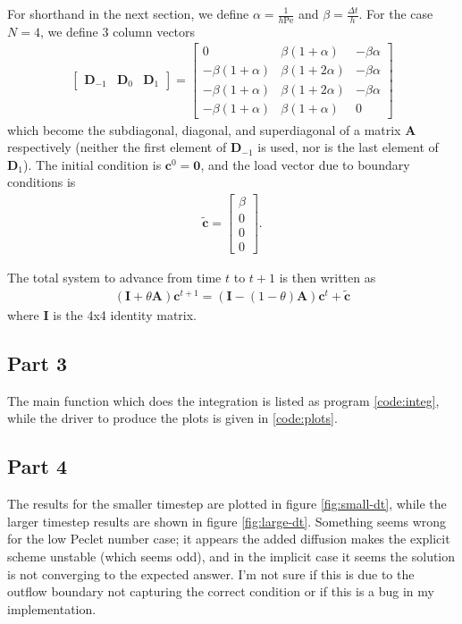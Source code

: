 \documentclass{article}
\begin{document}
For shorthand in the next section, we define $\alpha = \frac{1}{h \mathrm{Pe}}$ and $\beta = \frac{\Delta t}{h}$.
For the case $N=4$, we define 3 column vectors
\begin{align}
    \begin{bmatrix}\mathbf{D}_{-1}  & \mathbf{D}_{0} & \mathbf{D}_{1} \end{bmatrix} =
    \begin{bmatrix}
        0 & \beta (1 + \alpha) & - \beta \alpha \\
        -\beta (1 + \alpha) & \beta (1 + 2 \alpha) & - \beta \alpha \\
        -\beta (1 + \alpha) & \beta (1 + 2 \alpha) & - \beta \alpha \\
        -\beta (1 + \alpha) & \beta (1 + \alpha) & 0
    \end{bmatrix}
\end{align}
which become the subdiagonal, diagonal, and superdiagonal of a matrix $\mathbf{A}$ respectively (neither the first element of $\mathbf{D}_{-1}$ is used, nor is the last element of $\mathbf{D}_{1}$).
The initial condition is $\mathbf{c}^0 = \mathbf{0}$, and the load vector due to boundary conditions is
\begin{align}
    \mathbf{\tilde{c}} =
    \begin{bmatrix}
        \beta \\
        0 \\
        0 \\
        0 
    \end{bmatrix}.
\end{align}

The total system to advance from time $t$ to $t+1$ is then written as
\begin{align}
    (\mathbf{I} + \theta \mathbf{A}) \mathbf{c}^{t+1} = (\mathbf{I} - (1-\theta) \mathbf{A}) \mathbf{c}^{t} + \mathbf{\tilde{c}}
\end{align}
where $\mathbf{I}$ is the 4x4 identity matrix.

\subsection{Part 3}
The main function which does the integration is listed as program \ref{code:integ},
while the driver to produce the plots is given in \ref{code:plots}.



\subsection{Part 4}
The results for the smaller timestep are plotted in figure \ref{fig:small-dt}, while the larger timestep results are shown in figure \ref{fig:large-dt}.
Something seems wrong for the low Peclet number case; it appears the added diffusion makes the explicit scheme unstable (which seems odd), and in the implicit case it seems the solution is not converging to the expected answer. I'm not sure if this is due to the outflow boundary not capturing the correct condition or if this is a bug in my implementation.
\end{document}
